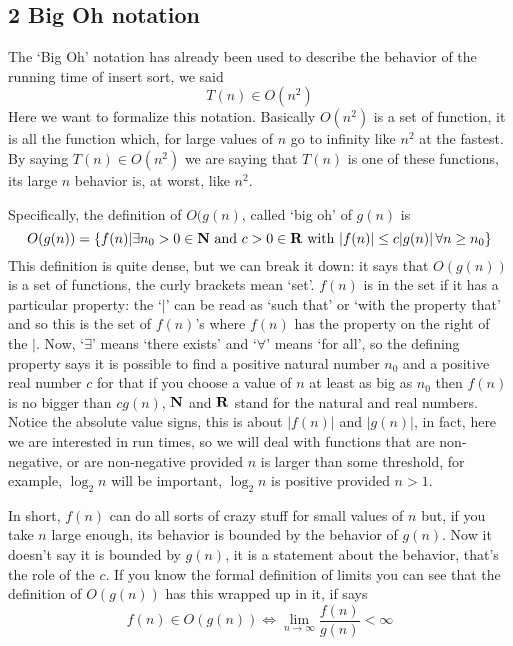 \documentclass[11pt,a4paper]{scrartcl}
\begin{document}
\subsection*{2 Big Oh notation}

The \lq{}Big Oh\rq{} notation has already been used to describe the
behavior of the running time of insert sort, we said
\begin{equation}
T(n)\in O(n^2)
\end{equation}
Here we want to formalize this notation. Basically $O(n^2)$ is a set
of function, it is all the function which, for large values of $n$ go
to infinity like $n^2$ at the fastest. By saying $T(n)\in O(n^2)$ we
are saying that $T(n)$ is one of these functions, its large $n$
behavior is, at worst, like $n^2$. 

Specifically, the definition of $O(g(n)$, called \lq{}big oh\rq{} of
$g(n)$ is
\begin{equation}
O(g(n))=\{f(n)| \exists n_0>0\in {\bf N}\mbox{ and }c>0\in {\bf R}\mbox{ with }|f(n)|\le c|g(n)|\,\forall n\ge n_0\}
\end{equation}
This definition is quite dense, but we can break it down: it says that
$O(g(n))$ is a set of functions, the curly brackets mean
\lq{}set\rq{}. $f(n)$ is in the set if it has a particular
property: the \lq$|$\rq{} can be read as \lq{}such that\rq{} or
\lq{}with the property that\rq{} and so this is the set of $f(n)$'s
where $f(n)$ has the property on the right of the $|$. Now,
\lq{}$\exists$\rq{} means \lq{}there exists\rq{} and
\lq{}$\forall$\rq{} means \lq{}for all\rq{}, so the defining property
says it is possible to find a positive natural number $n_0$ and a
positive real number $c$ for that if you choose a value of $n$ at
least as big as $n_0$ then $f(n)$ is no bigger than $cg(n)$, ${\bf N}$
and ${\bf R}$ stand for the natural and real numbers. Notice the
absolute value signs, this is about $|f(n)|$ and $|g(n)|$, in fact,
here we are interested in run times, so we will deal with functions
that are non-negative, or are non-negative provided $n$ is larger than
some threshold, for example, $\log_2{n}$ will be important,
$\log_2{n}$ is positive provided $n>1$.

In short, $f(n)$ can do all sorts of crazy stuff for small values of
$n$ but, if you take $n$ large enough, its behavior is bounded by the
behavior of $g(n)$. Now it doesn't say it is bounded by $g(n)$, it is
a statement about the behavior, that's the role of the $c$. If you
know the formal definition of limits you can see that the definition
of $O(g(n))$ has this wrapped up in it, if says
\begin{equation}
f(n)\in O(g(n))\iff \lim_{n\rightarrow \infty}\frac{f(n)}{g(n)}<\infty
\end{equation}
\end{document}
